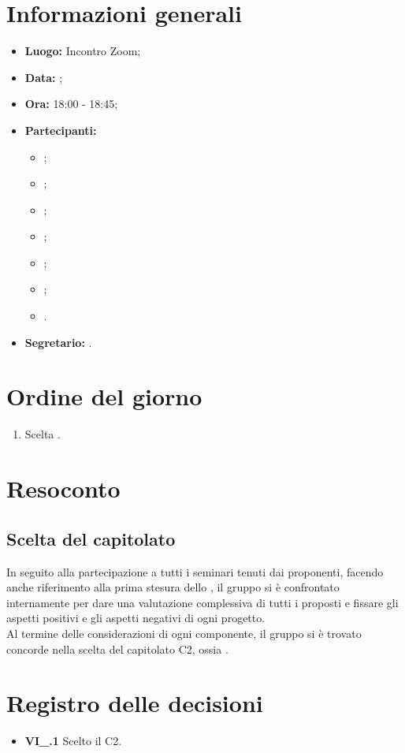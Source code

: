 \section{Informazioni generali}
\begin{itemize}
\item \textbf{Luogo:} Incontro Zoom;
\item \textbf{Data:} \Data;
\item \textbf{Ora:} 18:00 - 18:45;
\item \textbf{Partecipanti:}
	\begin{itemize}
		\item \BL{}; 
		\item \FF{};
		\item \MM{}; 
		\item \PC{};
		\item \TG{};
		\item \TL{};
		\item \VD{}.
	\end{itemize} 
\item \textbf{Segretario:} \PC{}.
\end{itemize}

\section{Ordine del giorno}
\begin{enumerate}
 \item Scelta .
\end{enumerate}

\section{Resoconto}
\subsection{Scelta del capitolato}
In seguito alla partecipazione a tutti i seminari tenuti dai proponenti, facendo anche riferimento alla prima stesura dello \SdF, il gruppo si è confrontato internamente per dare una valutazione complessiva di tutti i  proposti e fissare gli aspetti positivi e gli aspetti negativi di ogni progetto.\\
Al termine delle considerazioni di ogni componente, il gruppo si è trovato concorde nella scelta del capitolato C2, ossia \NomeProgetto.

\section{Registro delle decisioni}
\begin{itemize}
	\item \textbf{VI\_\Data.1} Scelto il  C2.
\end{itemize}